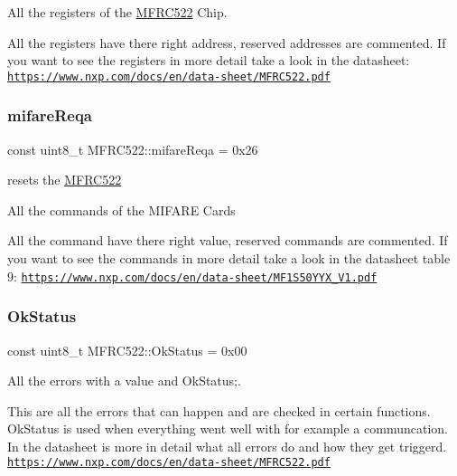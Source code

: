 All the registers of the \hyperlink{classMFRC522}{M\+F\+R\+C522} Chip. 

All the registers have there right address, reserved addresses are commented. If you want to see the registers in more detail take a look in the datasheet\+: \href{https://www.nxp.com/docs/en/data-sheet/MFRC522.pdf}{\tt https\+://www.\+nxp.\+com/docs/en/data-\/sheet/\+M\+F\+R\+C522.\+pdf} \mbox{\label{classMFRC522_a8e438d50133c5a2a106e9bdbdeeb19ec}} 
\subsubsection{\texorpdfstring{mifare\+Reqa}{mifareReqa}}
{\footnotesize\ttfamily const uint8\+\_\+t M\+F\+R\+C522\+::mifare\+Reqa = 0x26\hspace{0.3cm}{\ttfamily [static]}}



resets the \hyperlink{classMFRC522}{M\+F\+R\+C522} 

All the commands of the M\+I\+F\+A\+RE Cards

All the command have there right value, reserved commands are commented. If you want to see the commands in more detail take a look in the datasheet table 9\+: \href{https://www.nxp.com/docs/en/data-sheet/MF1S50YYX_V1.pdf}{\tt https\+://www.\+nxp.\+com/docs/en/data-\/sheet/\+M\+F1\+S50\+Y\+Y\+X\+\_\+\+V1.\+pdf} \mbox{\label{classMFRC522_a571732f99802b33ac2a6695afa1ec7a4}} 
\subsubsection{\texorpdfstring{Ok\+Status}{OkStatus}}
{\footnotesize\ttfamily const uint8\+\_\+t M\+F\+R\+C522\+::\+Ok\+Status = 0x00\hspace{0.3cm}{\ttfamily [static]}}



All the errors with a value and Ok\+Status;. 

This are all the errors that can happen and are checked in certain functions. Ok\+Status is used when everything went well with for example a communcation. In the datasheet is more in detail what all errors do and how they get triggerd. \href{https://www.nxp.com/docs/en/data-sheet/MFRC522.pdf}{\tt https\+://www.\+nxp.\+com/docs/en/data-\/sheet/\+M\+F\+R\+C522.\+pdf} \mbox{\label{classMFRC522_a7d19c9869a7fbbe0d9825d5653d6af7b}} 
